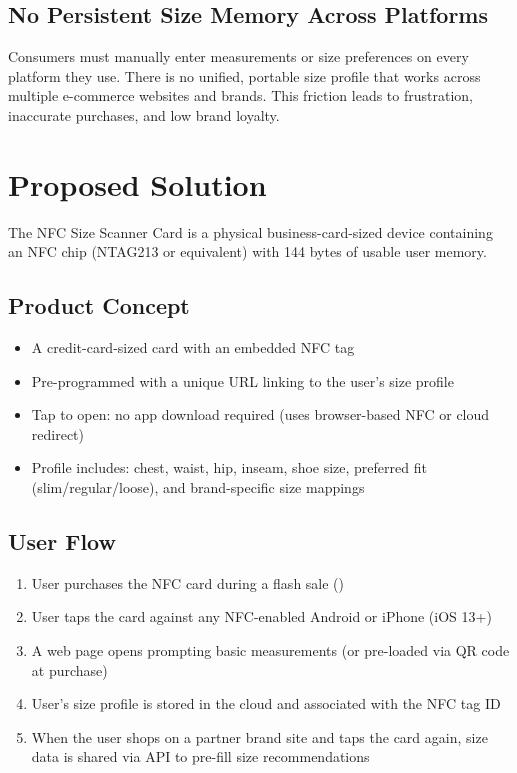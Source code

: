 \documentclass[12pt,a4paper]{article}
\begin{document}
\subsection{No Persistent Size Memory Across Platforms}
Consumers must manually enter measurements or size preferences on every platform they use. There is no unified, portable size profile that works across multiple e-commerce websites and brands. This friction leads to frustration, inaccurate purchases, and low brand loyalty.

\section{Proposed Solution}

The NFC Size Scanner Card is a physical business-card-sized device containing an NFC chip (NTAG213 or equivalent) with 144 bytes of usable user memory.

\subsection{Product Concept}
\begin{itemize}
    \item A credit-card-sized card with an embedded NFC tag
    \item Pre-programmed with a unique URL linking to the user's size profile
    \item Tap to open: no app download required (uses browser-based NFC or cloud redirect)
    \item Profile includes: chest, waist, hip, inseam, shoe size, preferred fit (slim/regular/loose), and brand-specific size mappings
\end{itemize}

\subsection{User Flow}
\begin{enumerate}
    \item User purchases the NFC card during a flash sale ()
    \item User taps the card against any NFC-enabled Android or iPhone (iOS 13+)
    \item A web page opens prompting basic measurements (or pre-loaded via QR code at purchase)
    \item User's size profile is stored in the cloud and associated with the NFC tag ID
    \item When the user shops on a partner brand site and taps the card again, size data is shared via API to pre-fill size recommendations
\end{enumerate}
\end{document}
